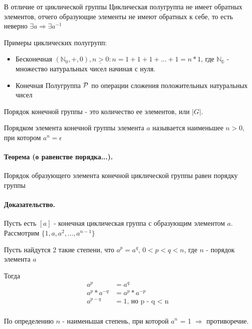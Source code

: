 \documentclass{report}
\begin{document}
В отличие от циклической группы Циклическая полугруппа не имеет обратных элементов, отчего
образующие элементы не имеют обратных к себе, то есть неверно $\exists a \Rightarrow \exists a^{-1}$

\medskip

Примеры циклических полугрупп:
\begin{itemize}
    \item Бесконечная\newline
          $(\mathbb{N}_0, +, 0), \underline{n > 0}: n = 1 + 1 + 1 + \ldots + 1 = n * 1$,
          где $\mathbb{N_{0}}$ - множество натуральных чисел начиная с нуля.
    \item Конечная\newline
          Полугруппа $\cal P$ по операции сложения положительных натуральных чисел
\end{itemize}

\medskip

Порядок конечной группы - это количество ее элементов, или $|G|$.

\medskip

Порядком элемента конечной группы элемента $a$ называется наименьшее $n > 0$, при котором
$a^{n} = \epsilon$

\paragraph*{Теорема (о равенстве порядка...).}
Порядок образующего элемента конечной циклической группы равен порядку группы
\paragraph*{Доказательство.}
Пусть есть $[a]$ - конечная циклическая группа с образующим элементом $a$.
Рассмотрим $\{1,a,a^{2},\ldots, a^{n-1}\}$

Пусть найдутся 2 такие степени, что $a^{p} = a^{q}$, $0 < p < q < n$, где $n$ - порядок элемента $a$

Тогда
\begin{align*}
    a^{p}          & = a^{q}                   \\
    a^{p} * a^{-q} & = a^{p} * a^{-p}          \\
    a^{p-q}        & = 1 \mbox{, но p - q < n} \\
\end{align*}

По определению $n$ - наименьшая степень, при которой $a^{n}$ = 1 $\Rightarrow$ противоречие.
\end{document}
